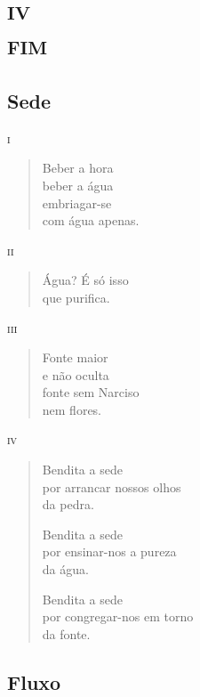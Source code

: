 \part*{\textsc{iv}\\\textsc{fim}}


\chapter{Sede}

\forceindent\textsc{i}

\begin{verse}
Beber a hora\\
beber a água\\
embriagar-se\\
com água apenas.
\end{verse}

\medskip
\textsc{ii}

\begin{verse}
Água? É só isso\\
que purifica.
\end{verse}

\medskip
\textsc{iii}

\begin{verse}
Fonte maior\\
e não oculta\\
fonte sem Narciso\\
nem flores.
\end{verse}

\medskip
\textsc{iv}

\begin{verse}
Bendita a sede\\
por arrancar nossos olhos\\
da pedra.

Bendita a sede\\
por ensinar-nos a pureza\\
da água.

Bendita a sede\\
por congregar-nos em torno\\
da fonte.
\end{verse}

\chapter{Fluxo}

